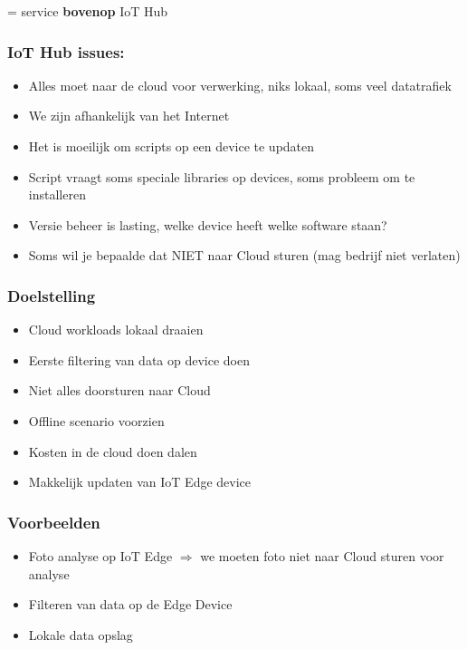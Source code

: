\documentclass{article}
\newcommand{\bold}[1]{\textbf{#1}}
\begin{document}
= service \bold{bovenop} IoT Hub

\subsubsection{IoT Hub issues:}

\begin{itemize}
    \item Alles moet naar de cloud voor verwerking, niks lokaal, soms veel datatrafiek
    \item We zijn afhankelijk van het Internet
    \item Het is moeilijk om scripts op een device te updaten
    \item Script vraagt soms speciale libraries op devices, soms probleem om te installeren
    \item Versie beheer is lasting, welke device heeft welke software staan?
    \item Soms wil je bepaalde dat NIET naar Cloud sturen (mag bedrijf niet verlaten)
\end{itemize}

\subsubsection{Doelstelling}

\begin{itemize}
    \item Cloud workloads lokaal draaien
    \item Eerste filtering van data op device doen
    \item Niet alles doorsturen naar Cloud
    \item Offline scenario voorzien
    \item Kosten in de cloud doen dalen
    \item Makkelijk updaten van IoT Edge device
\end{itemize}

\subsubsection{Voorbeelden}

\begin{itemize}
    \item Foto analyse op IoT Edge $\Rightarrow$ we moeten foto niet naar Cloud sturen voor analyse
    \item Filteren van data op de Edge Device
    \item Lokale data opslag
\end{itemize}
\end{document}
